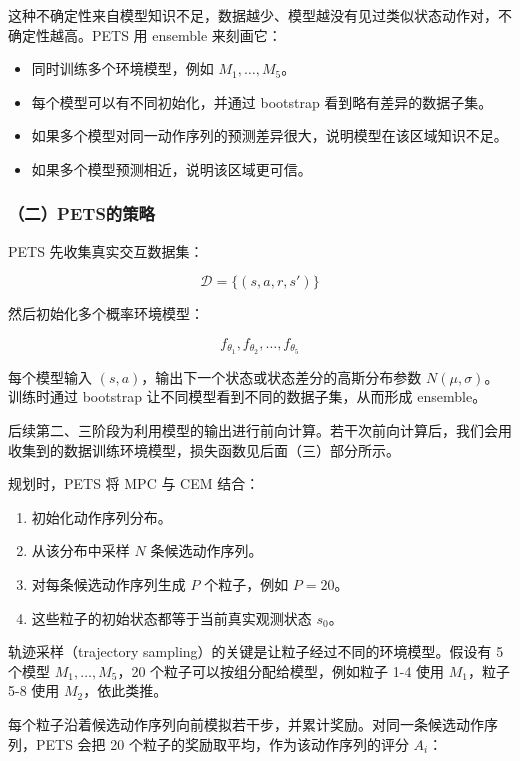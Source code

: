这种不确定性来自模型知识不足，数据越少、模型越没有见过类似状态动作对，不确定性越高。PETS 用 ensemble 来刻画它：

\begin{itemize}
\tightlist
\item
  同时训练多个环境模型，例如 \(M_1,\ldots,M_5\)。
\item
  每个模型可以有不同初始化，并通过 bootstrap 看到略有差异的数据子集。
\item
  如果多个模型对同一动作序列的预测差异很大，说明模型在该区域知识不足。
\item
  如果多个模型预测相近，说明该区域更可信。
\end{itemize}

\hypertarget{ux4e8cpetsux7684ux7b56ux7565}{%
\subsubsection{（二）PETS的策略}\label{ux4e8cpetsux7684ux7b56ux7565}}

PETS 先收集真实交互数据集：

\[
\mathcal D=\{(s,a,r,s')\}
\]

然后初始化多个概率环境模型：

\[
f_{\theta_1},f_{\theta_2},\ldots,f_{\theta_5}
\]

每个模型输入 \((s,a)\)，输出下一个状态或状态差分的高斯分布参数 \(N(\mu,\sigma)\)。训练时通过 bootstrap 让不同模型看到不同的数据子集，从而形成 ensemble。

后续第二、三阶段为利用模型的输出进行前向计算。若干次前向计算后，我们会用收集到的数据训练环境模型，损失函数见后面（三）部分所示。

规划时，PETS 将 MPC 与 CEM 结合：

\begin{enumerate}
\def\labelenumi{\arabic{enumi}.}
\tightlist
\item
  初始化动作序列分布。
\item
  从该分布中采样 \(N\) 条候选动作序列。
\item
  对每条候选动作序列生成 \(P\) 个粒子，例如 \(P=20\)。
\item
  这些粒子的初始状态都等于当前真实观测状态 \(s_0\)。
\end{enumerate}

轨迹采样（trajectory sampling）的关键是让粒子经过不同的环境模型。假设有 5 个模型 \(M_1,\ldots,M_5\)，20 个粒子可以按组分配给模型，例如粒子 1-4 使用 \(M_1\)，粒子 5-8 使用 \(M_2\)，依此类推。

每个粒子沿着候选动作序列向前模拟若干步，并累计奖励。对同一条候选动作序列，PETS 会把 20 个粒子的奖励取平均，作为该动作序列的评分 \(A_i\)：

